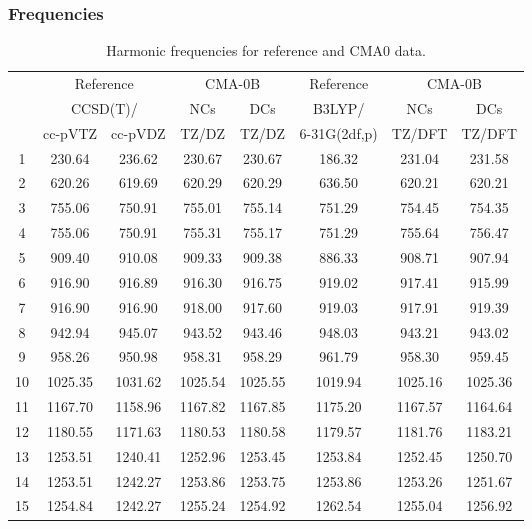 \documentclass[10pt,oneside]{article}
\begin{document}
\clearpage

\subsubsection*{Frequencies}
\begin{table}[h!]
\centering
\caption{Harmonic frequencies for reference and CMA0 data.}
\begin{tabular}{cccccccc}
\toprule
{} & \multicolumn{2}{c}{Reference} & \multicolumn{2}{c}{CMA-0B} &    Reference & \multicolumn{2}{c}{CMA-0B} \\
{} & \multicolumn{2}{c}{CCSD(T)/} &     NCs &     DCs &       B3LYP/ &     NCs &     DCs \\
{} &   cc-pVTZ & cc-pVDZ &   TZ/DZ &   TZ/DZ & 6-31G(2df,p) &  TZ/DFT &  TZ/DFT \\
\midrule
1  &    230.64 &  236.62 &  230.67 &  230.67 &       186.32 &  231.04 &  231.58 \\
2  &    620.26 &  619.69 &  620.29 &  620.29 &       636.50 &  620.21 &  620.21 \\
3  &    755.06 &  750.91 &  755.01 &  755.14 &       751.29 &  754.45 &  754.35 \\
4  &    755.06 &  750.91 &  755.31 &  755.17 &       751.29 &  755.64 &  756.47 \\
5  &    909.40 &  910.08 &  909.33 &  909.38 &       886.33 &  908.71 &  907.94 \\
6  &    916.90 &  916.89 &  916.30 &  916.75 &       919.02 &  917.41 &  915.99 \\
7  &    916.90 &  916.90 &  918.00 &  917.60 &       919.03 &  917.91 &  919.39 \\
8  &    942.94 &  945.07 &  943.52 &  943.46 &       948.03 &  943.21 &  943.02 \\
9  &    958.26 &  950.98 &  958.31 &  958.29 &       961.79 &  958.30 &  959.45 \\
10 &   1025.35 & 1031.62 & 1025.54 & 1025.55 &      1019.94 & 1025.16 & 1025.36 \\
11 &   1167.70 & 1158.96 & 1167.82 & 1167.85 &      1175.20 & 1167.57 & 1164.64 \\
12 &   1180.55 & 1171.63 & 1180.53 & 1180.58 &      1179.57 & 1181.76 & 1183.21 \\
13 &   1253.51 & 1240.41 & 1252.96 & 1253.45 &      1253.84 & 1252.45 & 1250.70 \\
14 &   1253.51 & 1242.27 & 1253.86 & 1253.75 &      1253.86 & 1253.26 & 1251.67 \\
15 &   1254.84 & 1242.27 & 1255.24 & 1254.92 &      1262.54 & 1255.04 & 1256.92 \\

\end{tabular}
\end{table}
\end{document}
